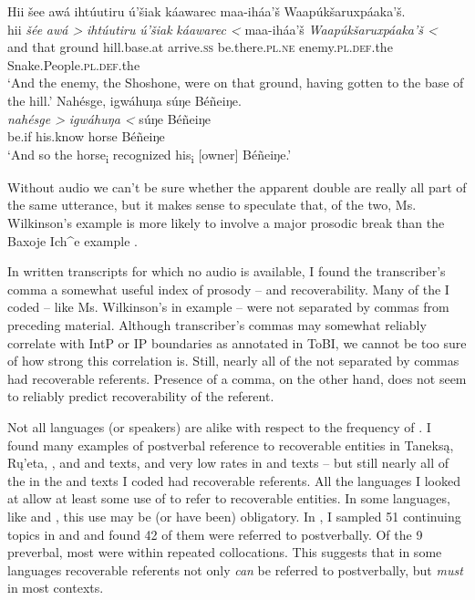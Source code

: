 \documentclass[output=paper]{LSP/langsci}
\begin{document}
\ea\label{multiplepostverbal}
\ea\label{wilkinsonmultiplepostverbal}
Hii šee awá ihtúutiru ú’šiak káawarec maa-iháa’š Waapúkšaruxpáaka’š.\footnotemark\\
\gll	hii 		\emph{šée} 		\emph{awá >}		\emph{ihtúutiru} 			\emph{ú’šiak} 		\emph{káawarec <}	maa-iháa’š 				\emph{Waapúkšaruxpáaka’š <}\\
	and 		that	 		ground 			hill.base.at	 			arrive.\textsc{ss} 		be.there.\textsc{pl.ne}	enemy.\textsc{pl.def}.the 		Snake.People.\textsc{pl.def}.the\\
\glt	`And the enemy, the Shoshone, were on that ground, having gotten to the base of the hill.'
\ex\label{baxojemultiplepostverbal}
Nahésge, igwáhuŋa súŋe Béñeiŋe.\footnotemark\\
\gll	\emph{nahésge >}	\emph{igwáhuŋa <}	súŋe 		Béñeiŋe\\
	be.if 			his.know 			horse 		Béñeiŋe\\
\glt	`And so the horse\textsubscript{i} recognized his\textsubscript{i} [owner] Béñeiŋe.'
\z\z

Without audio we can’t be sure whether the apparent double  are really all part of the same utterance, but it makes sense to speculate that, of the two, Ms. Wilkinson’s example  is more likely to involve a major prosodic break than the Baxoje Ich\^{}e example .

In written transcripts for which no audio is available, I found the transcriber’s comma a somewhat useful index of prosody -- and recoverability. Many of the  I coded -- like Ms. Wilkinson’s in example  -- were not separated by commas from preceding material. Although transcriber’s commas may somewhat reliably correlate with IntP or IP boundaries as annotated in ToBI, we cannot be too sure of how strong this correlation is. Still, nearly all of the  not separated by commas had recoverable referents. Presence of a comma, on the other hand, does not seem to reliably predict recoverability of the referent.

Not all languages (or speakers) are alike with respect to the frequency of . I found many examples of postverbal reference to recoverable entities in Taneksą, Rų’eta, , and  and  texts, and very low rates in  and  texts -- but still nearly all of the  in the  and  texts I coded had recoverable referents. All the languages I looked at allow at least some use of  to refer to recoverable entities. In some languages, like  and , this use may be (or have been) obligatory. In \citet{Gordon2008}, I sampled 51 continuing topics in  and  and found 42 of them were referred to postverbally. Of the 9 preverbal, most were within repeated collocations. This suggests that in some languages recoverable referents not only \emph{can} be referred to postverbally, but \emph{must} in most contexts.
\end{document}
